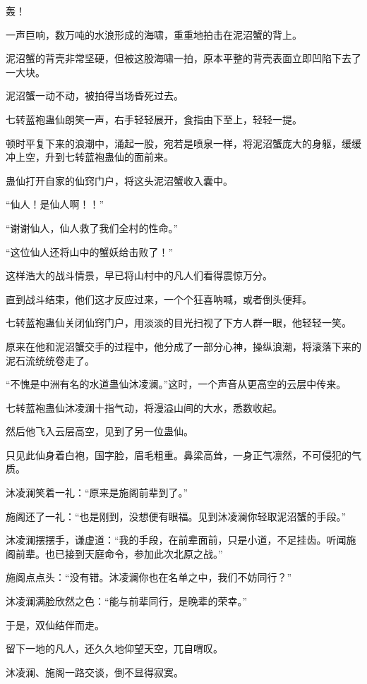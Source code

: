 \begin{this_body}
轰！

一声巨响，数万吨的水浪形成的海啸，重重地拍击在泥沼蟹的背上。

泥沼蟹的背壳非常坚硬，但被这股海啸一拍，原本平整的背壳表面立即凹陷下去了一大块。

泥沼蟹一动不动，被拍得当场昏死过去。

七转蓝袍蛊仙朗笑一声，右手轻轻展开，食指由下至上，轻轻一提。

顿时平复下来的浪潮中，涌起一股，宛若是喷泉一样，将泥沼蟹庞大的身躯，缓缓冲上空，升到七转蓝袍蛊仙的面前来。

蛊仙打开自家的仙窍门户，将这头泥沼蟹收入囊中。

“仙人！是仙人啊！！”

“谢谢仙人，仙人救了我们全村的性命。”

“这位仙人还将山中的蟹妖给击败了！”

这样浩大的战斗情景，早已将山村中的凡人们看得震惊万分。

直到战斗结束，他们这才反应过来，一个个狂喜呐喊，或者倒头便拜。

七转蓝袍蛊仙关闭仙窍门户，用淡淡的目光扫视了下方人群一眼，他轻轻一笑。

原来在他和泥沼蟹交手的过程中，他分成了一部分心神，操纵浪潮，将滚落下来的泥石流统统卷走了。

“不愧是中洲有名的水道蛊仙沐凌澜。”这时，一个声音从更高空的云层中传来。

七转蓝袍蛊仙沐凌澜十指气动，将漫溢山间的大水，悉数收起。

然后他飞入云层高空，见到了另一位蛊仙。

只见此仙身着白袍，国字脸，眉毛粗重。鼻梁高耸，一身正气凛然，不可侵犯的气质。

沐凌澜笑着一礼：“原来是施阁前辈到了。”

施阁还了一礼：“也是刚到，没想便有眼福。见到沐凌澜你轻取泥沼蟹的手段。”

沐凌澜摆摆手，谦虚道：“我的手段，在前辈面前，只是小道，不足挂齿。听闻施阁前辈。也已接到天庭命令，参加此次北原之战。”

施阁点点头：“没有错。沐凌澜你也在名单之中，我们不妨同行？”

沐凌澜满脸欣然之色：“能与前辈同行，是晚辈的荣幸。”

于是，双仙结伴而走。

留下一地的凡人，还久久地仰望天空，兀自喟叹。

沐凌澜、施阁一路交谈，倒不显得寂寞。


\end{this_body}
